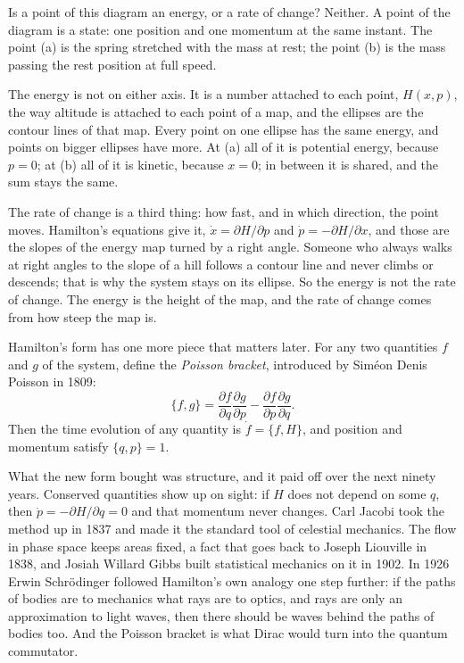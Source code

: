 \begin{reflection}{Is a point of this diagram an energy, or a rate of change?}
Neither. A point of the diagram is a state: one position and one momentum at the
same instant. The point (a) is the spring stretched with the mass at rest; the point
(b) is the mass passing the rest position at full speed.

The energy is not on either axis. It is a number attached to each point, $H(x, p)$,
the way altitude is attached to each point of a map, and the ellipses are the
contour lines of that map. Every point on one ellipse has the same energy, and points
on bigger ellipses have more. At (a) all of it is potential energy, because $p = 0$;
at (b) all of it is kinetic, because $x = 0$; in between it is shared, and the sum
stays the same.

The rate of change is a third thing: how fast, and in which direction, the point
moves. Hamilton's equations give it, $\dot x = \partial H/\partial p$ and
$\dot p = -\partial H/\partial x$, and those are the slopes of the energy map turned
by a right angle. Someone who always walks at right angles to the slope of a hill
follows a contour line and never climbs or descends; that is why the system stays on
its ellipse. So the energy is not the rate of change. The energy is the height of the
map, and the rate of change comes from how steep the map is.
\end{reflection}

Hamilton's form has one more piece that matters later. For any two quantities
$f$ and $g$ of the system, define the \emph{Poisson bracket}, introduced by
Siméon Denis Poisson in 1809:
\[
  \{f, g\} = \frac{\partial f}{\partial q}\frac{\partial g}{\partial p}
           - \frac{\partial f}{\partial p}\frac{\partial g}{\partial q}.
\]
Then the time evolution of any quantity is $\dot f = \{f, H\}$, and position and
momentum satisfy $\{q, p\} = 1$.

What the new form bought was structure, and it paid off over the next ninety years.
Conserved quantities show up on sight: if $H$ does not depend on some $q$, then
$\dot p = -\partial H/\partial q = 0$ and that momentum never changes. Carl Jacobi took
the method up in 1837 and made it the standard tool of celestial mechanics. The flow
in phase space keeps areas fixed, a fact that goes back to Joseph Liouville in 1838,
and Josiah Willard Gibbs built statistical mechanics on it in 1902. In 1926 Erwin
Schrödinger followed Hamilton's own analogy one step further: if the paths of bodies
are to mechanics what rays are to optics, and rays are only an approximation to light
waves, then there should be waves behind the paths of bodies too. And the Poisson
bracket is what Dirac would turn into the quantum commutator.

